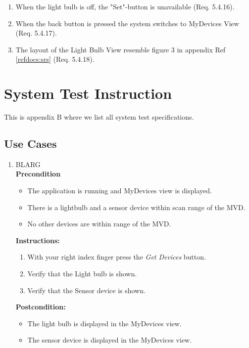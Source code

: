 \documentclass[a4paper]{article}
\newlength{\testlabellength}
\newenvironment{testlist}{\begin{enumerate}[label=\bfseries Instruction \thesubsection.\arabic* , labelindent=0pt, labelwidth=\testlabellength , leftmargin=2cm]}{\end{enumerate}}
\newenvironment{precondition}{
{\color{white}BLARG}\\ 
\textbf{Precondition}
\begin{itemize}[labelindent=0cm, labelwidth=2cm , leftmargin=1cm]
}
{\end{itemize}}
\newenvironment{instruction}{
\textbf{Instructions:}
\begin{enumerate}[label=\bfseries  \arabic*., labelindent=0cm, labelwidth=2cm , leftmargin=1cm]
}
{\end{enumerate}}
\newenvironment{postcondition}{
\textbf{Postcondition:}
\begin{itemize}[labelindent=0cm, labelwidth=2cm , leftmargin=1cm]
}
{\end{itemize}}
\begin{document}
\begin{appendices}
\begin{testlist}
    \item When the light bulb is off, the "Set"-button is unavailable (Req. 5.4.16).
    
    \item When the back button is pressed the system switches to MyDevices View (Req. 5.4.17).
    
    \item The layout of the Light Bulb View resemble figure 3 in appendix  Ref \ref{refdocs:srs} (Req. 5.4.18).

\end{testlist}	

\newpage

\section{System Test Instruction} \label{appendix:section:systemtest}
This is appendix B where we list all system test specifications.

\subsection{Use Cases}
\begin{testlist}
	\item 
		\begin{precondition}
			\item The application is running and MyDevices view is displayed.
			\item There is a lightbulb and a sensor device within scan range of the MVD.
			\item No other devices are within range of the MVD.
		\end{precondition}
		\begin{instruction}
			\item With your right index finger press the \emph{Get Devices} button.
			\item Verify that the Light bulb is shown.
			\item Verify that the Sensor device is shown.
		\end{instruction}
		\begin{postcondition}
			\item The light bulb is displayed in the MyDevices view.
		 	\item The sensor device is displayed in the MyDevices view.
		\end{postcondition}


\end{testlist}
\end{appendices}
\end{document}
